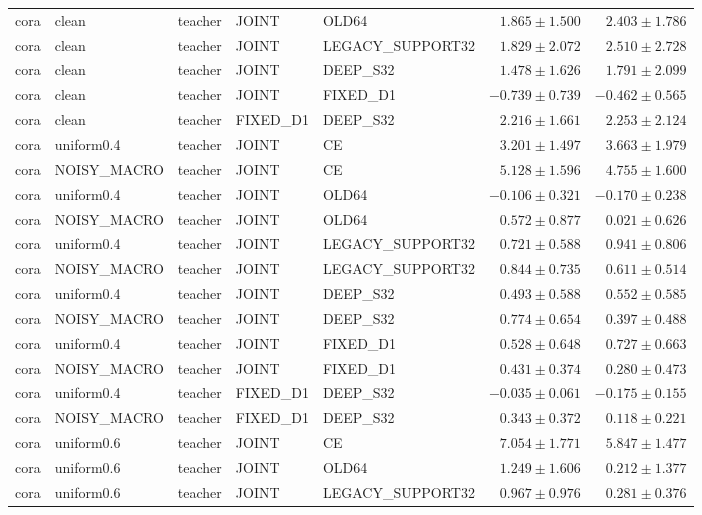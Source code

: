 \begin{longtable}{lllllrr}
cora & clean & teacher & JOINT & OLD64 & $1.865 \pm 1.500$ & $2.403 \pm 1.786$ \\
cora & clean & teacher & JOINT & LEGACY\_SUPPORT32 & $1.829 \pm 2.072$ & $2.510 \pm 2.728$ \\
cora & clean & teacher & JOINT & DEEP\_S32 & $1.478 \pm 1.626$ & $1.791 \pm 2.099$ \\
cora & clean & teacher & JOINT & FIXED\_D1 & $-0.739 \pm 0.739$ & $-0.462 \pm 0.565$ \\
cora & clean & teacher & FIXED\_D1 & DEEP\_S32 & $2.216 \pm 1.661$ & $2.253 \pm 2.124$ \\
cora & uniform0.4 & teacher & JOINT & CE & $3.201 \pm 1.497$ & $3.663 \pm 1.979$ \\
cora & NOISY\_MACRO & teacher & JOINT & CE & $5.128 \pm 1.596$ & $4.755 \pm 1.600$ \\
cora & uniform0.4 & teacher & JOINT & OLD64 & $-0.106 \pm 0.321$ & $-0.170 \pm 0.238$ \\
cora & NOISY\_MACRO & teacher & JOINT & OLD64 & $0.572 \pm 0.877$ & $0.021 \pm 0.626$ \\
cora & uniform0.4 & teacher & JOINT & LEGACY\_SUPPORT32 & $0.721 \pm 0.588$ & $0.941 \pm 0.806$ \\
cora & NOISY\_MACRO & teacher & JOINT & LEGACY\_SUPPORT32 & $0.844 \pm 0.735$ & $0.611 \pm 0.514$ \\
cora & uniform0.4 & teacher & JOINT & DEEP\_S32 & $0.493 \pm 0.588$ & $0.552 \pm 0.585$ \\
cora & NOISY\_MACRO & teacher & JOINT & DEEP\_S32 & $0.774 \pm 0.654$ & $0.397 \pm 0.488$ \\
cora & uniform0.4 & teacher & JOINT & FIXED\_D1 & $0.528 \pm 0.648$ & $0.727 \pm 0.663$ \\
cora & NOISY\_MACRO & teacher & JOINT & FIXED\_D1 & $0.431 \pm 0.374$ & $0.280 \pm 0.473$ \\
cora & uniform0.4 & teacher & FIXED\_D1 & DEEP\_S32 & $-0.035 \pm 0.061$ & $-0.175 \pm 0.155$ \\
cora & NOISY\_MACRO & teacher & FIXED\_D1 & DEEP\_S32 & $0.343 \pm 0.372$ & $0.118 \pm 0.221$ \\
cora & uniform0.6 & teacher & JOINT & CE & $7.054 \pm 1.771$ & $5.847 \pm 1.477$ \\
cora & uniform0.6 & teacher & JOINT & OLD64 & $1.249 \pm 1.606$ & $0.212 \pm 1.377$ \\
cora & uniform0.6 & teacher & JOINT & LEGACY\_SUPPORT32 & $0.967 \pm 0.976$ & $0.281 \pm 0.376$ \\

\end{longtable}
